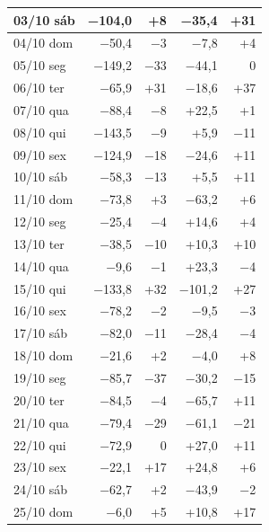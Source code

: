 \begin{table}[!htb]
\begin{tabular}{|l|r|r|r|r|}
\hline
03/10 sáb & −104,0 & +8 & −35,4 & +31 \\
\hline
04/10 dom & −50,4 & −3 & −7,8 & +4 \\
\hline
05/10 seg & −149,2 & −33 & −44,1 & 0 \\
\hline
06/10 ter & −65,9 & +31 & −18,6 & +37 \\
\hline
07/10 qua & −88,4 & −8 & +22,5 & +1 \\
\hline
08/10 qui & −143,5 & −9 & +5,9 & −11 \\
\hline
09/10 sex & −124,9 & −18 & −24,6 & +11 \\
\hline
10/10 sáb & −58,3 & −13 & +5,5 & +11 \\
\hline
11/10 dom & −73,8 & +3 & −63,2 & +6 \\
\hline
12/10 seg & −25,4 & −4 & +14,6 & +4 \\
\hline
13/10 ter & −38,5 & −10 & +10,3 & +10 \\
\hline
14/10 qua & −9,6 & −1 & +23,3 & −4 \\
\hline
15/10 qui & −133,8 & +32 & −101,2 & +27 \\
\hline
16/10 sex & −78,2 & −2 & −9,5 & −3 \\
\hline
17/10 sáb & −82,0 & −11 & −28,4 & −4 \\
\hline
18/10 dom & −21,6 & +2 & −4,0 & +8 \\
\hline
19/10 seg & −85,7 & −37 & −30,2 & −15 \\
\hline
20/10 ter & −84,5 & −4 & −65,7 & +11 \\
\hline
21/10 qua & −79,4 & −29 & −61,1 & −21 \\
\hline
22/10 qui & −72,9 & 0 & +27,0 & +11 \\
\hline
23/10 sex & −22,1 & +17 & +24,8 & +6 \\
\hline
24/10 sáb & −62,7 & +2 & −43,9 & −2 \\
\hline
25/10 dom & −6,0 & +5 & +10,8 & +17 \\
\hline
\end{tabular}
\end{table}


